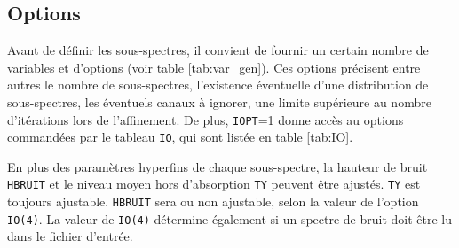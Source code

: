 \subsection{Options}
\label{part:options}
Avant de définir les sous-spectres, il convient de fournir un certain nombre de variables et d'options (voir table \ref{tab:var_gen}).
Ces options précisent entre autres le nombre de sous-spectres, l'existence éventuelle d'une distribution de sous-spectres, les éventuels canaux à ignorer, une limite supérieure au nombre d'itérations lors de l'affinement.
De plus, \lstinline{IOPT}=1 donne accès au options commandées par le tableau \lstinline{IO}, qui sont listée en table \ref{tab:IO}. 

En plus des paramètres hyperfins de chaque sous-spectre, la hauteur de bruit \lstinline{HBRUIT} et le niveau moyen hors d'absorption \lstinline{TY} peuvent être ajustés.
\lstinline{TY} est toujours ajustable. 
\lstinline{HBRUIT} sera ou non  ajustable, selon la valeur de l'option \lstinline{IO(4)}.
La valeur de \lstinline{IO(4)} détermine également si un spectre de bruit doit être lu dans le fichier d'entrée.

